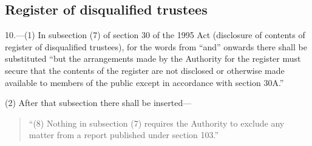 \documentclass[12pt,a4paper]{article}
\begin{document}
\subsection*{Register of disqualified trustees}

10.---(1) In subsection (7)  of section 30 of the 1995 Act (disclosure of contents of register of disqualified trustees), for the words from “and” onwards there shall be substituted “but the arrangements made by the Authority for the register must secure that the contents of the register are not disclosed or otherwise made available to members of the public except in accordance with section 30A.”

(2) After that subsection there shall be inserted—
\begin{quotation}
“(8) Nothing in subsection (7)  requires the Authority to exclude any matter from a report published under section 103.”
\end{quotation}
\end{document}
